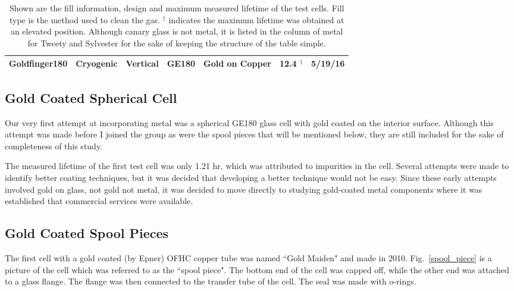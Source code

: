 \begin{table}
\begin{center}
\begin{tabular}{|c|c|c|c|c|c|c|}
			Goldfinger180 & Cryogenic & Vertical & GE180 & Gold on Copper & 12.4 $^\dagger$ & 5/19/16\\ \hline
		\end{tabular}
		\caption
		{Shown are the fill information, design and maximum measured lifetime of the test cells. Fill type is the method used to clean the gas. $^\dagger$ indicates the maximum lifetime was obtained at an elevated position. Although canary glass is not metal, it is listed in the column of metal for Tweety and Sylvester for the sake of keeping the structure of the table simple.}
		\label{test_cells}
	\end{center}
\end{table}

\subsection{Gold Coated Spherical Cell}

Our very first attempt at incorporating metal was a spherical GE180 glass cell with gold coated on the interior surface. Although this attempt was made before I joined the group as were the spool pieces that will be mentioned below, they are still included for the sake of completeness of this study. 

The measured lifetime of the first test cell was only 1.21 hr, which was attributed to impurities in the cell. Several attempts were made to identify better coating techniques, but it was decided that developing a better technique would not be easy. Since these early attempts involved gold on glass, not gold not metal, it was decided to move directly to studying gold-coated metal components where it was established that commercial services were available.

\subsection{Gold Coated Spool Pieces}

The first cell with a gold coated (by Epner) OFHC copper tube was named ``Gold Maiden" and made in 2010. Fig.~\ref{spool_piece} is a picture of the cell which was referred to as the ``spool piece". The bottom end of the cell was capped off, while the other end was attached to a glass flange. The flange was then connected to the transfer tube of the cell. The seal was made with o-rings. 

